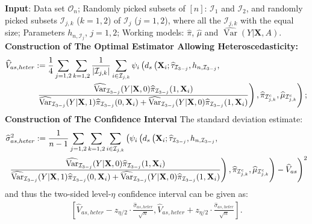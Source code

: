 \documentclass[11pt]{article}
\theoremstyle{referenceplain}
\theoremstyle{referencedefinition}
\theoremstyle{referenceremark}
\begin{document}
\begin{algorithm}[H]
\caption{The Optimal Estimator Allowing Heteroscedasticity}
    \begin{algorithmic}[1]
        \State \textbf{Input}: Data set $\mathcal{O}_n$; Randomly picked subsets of $[n]$: $\mathcal{I}_1$ and $\mathcal{I}_2$, and randomly picked subsets $\mathcal{I}_{j,k}$ ($k=1,2$) of $\mathcal{I}_j$ ($j=1,2$), where all the $\mathcal{I}_{j,k}$ with the equal size; Parameters $h_{n,\mathcal{I}_j}$, $j=1,2$; Working models: $\widehat{\pi}$, $\widehat{\mu}$ and $\widehat{\operatorname{Var}}(Y|\mathbf{X},A)$.
        \State \textbf{Construction of 
 The Optimal Estimator Allowing Heteroscedasticity:} 
 \begin{align}
     \widehat{V}_{as,heter}&:= \frac{1}{4}\sum_{j=1,2}\sum_{k=1,2}\frac{1}{|\mathcal{I}_{j,k}|}\sum_{i\in\mathcal{I}_{j,k}}\psi_i\left(d_{s}\left(\mathbf{X}_i;\widehat{\tau}_{\mathcal{I}_{3-j}},h_{n,\mathcal{I}_{3-j}},\right.\right.\notag\\&\left.\left.  \frac{\widehat{\operatorname{Var}}_{\mathcal{I}_{3-j}}(Y|\mathbf{X},0)\widehat{\pi}_{\mathcal{I}_{3-j}}(1,\mathbf{X}_i)}{\widehat{\operatorname{Var}}_{\mathcal{I}_{3-j}}(Y|\mathbf{X},1)\widehat{\pi}_{\mathcal{I}_{3-j}}(0,\mathbf{X}_i)+\widehat{\operatorname{Var}}_{\mathcal{I}_{3-j}}(Y|\mathbf{X},0)\widehat{\pi}_{\mathcal{I}_{3-j}}(1,\mathbf{X}_i)}\right),\widehat{\pi}_{\mathcal{I}_{j,k}^c},\widehat{\mu}_{\mathcal{I}_{j,k}^c}\right);\label{sin-opt-est-heter}
 \end{align}
 \State \textbf{Construction of The Confidence Interval} The standard deviation estimate:
 \begin{align}\label{sin-opt-std-heter}
    &\widehat{\sigma}_{as,heter}^2:=\frac{1}{n-1}\sum_{j=1,2}\sum_{k=1,2}\sum_{i\in\mathcal{I}_{j,k}}\left(\psi_i\left(d_{s}\left(\mathbf{X}_i;\widehat{\tau}_{\mathcal{I}_{3-j}},h_{n,\mathcal{I}_{3-j}},\right.\right.\right.\notag\\&\left.\left.\left.\frac{\widehat{\operatorname{Var}}_{\mathcal{I}_{3-j}}(Y|\mathbf{X},0)\widehat{\pi}_{\mathcal{I}_{3-j}}(1,\mathbf{X}_i)}{\widehat{\operatorname{Var}}_{\mathcal{I}_{3-j}}(Y|\mathbf{X},1)\widehat{\pi}_{\mathcal{I}_{3-j}}(0,\mathbf{X}_i)+\widehat{\operatorname{Var}}_{\mathcal{I}_{3-j}}(Y|\mathbf{X},0)\widehat{\pi}_{\mathcal{I}_{3-j}}(1,\mathbf{X}_i)}\right),\widehat{\pi}_{\mathcal{I}_{j,k}^c},\widehat{\mu}_{\mathcal{I}_{j,k}^c}\right)-\widehat{V}_{as}\right)^2
 \end{align}
 and thus the two-sided level-{$\eta$} confidence interval can be given as:
 \begin{align*}
     \left[\widehat{V}_{as,heter}-{z_{\eta/2}}\cdot\frac{\widehat{\sigma}_{as,heter}}{\sqrt{n}},\widehat{V}_{as,heter}+{z_{\eta/2}}\cdot\frac{\widehat{\sigma}_{as,heter}}{\sqrt{n}}\right].
 \end{align*}
    \end{algorithmic}
    \label{alg-single-heter}
\end{algorithm}
\end{document}

